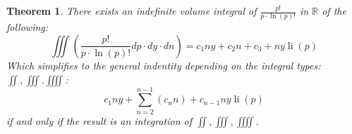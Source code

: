 \documentclass[11pt, a4paper]{article}
\theoremstyle{plain}
\newtheorem{theorem}{Theorem}[section]
\theoremstyle{definition}
\theoremstyle{remark}
\begin{document}
\begin{theorem}
  There exists an indefinite volume integral of $\frac{p!}{p \cdot \ln \left(p\right)!}$ in $\mathbb{R}$ of the following:
  \begin{equation}
    \iiint (\frac{p!}{p \cdot \ln \left(p\right)!} dp \cdot dy \cdot dn )= c_{1} n y + c_{2} n + c_{3} + n y \operatorname{li}(p)
  \end{equation}
  Which simplifies to the general indentity depending on the integral types: $\iint, \iiint. \iiiint$:
  \begin{equation}
    c_{1} n y + \sum_{n=2}^{n-1} ( c_{n} n ) + c_{n-1} n y \operatorname{li}(p)
  \end{equation}
  if and only if the result is an integration of $\iint, \iiint, \iiiint$.
\end{theorem}
\end{document}
